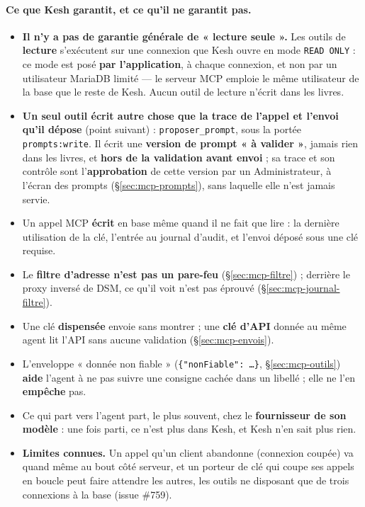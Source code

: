 \documentclass[a4paper,11pt,oneside]{article}
\begin{document}
\paragraph{Ce que Kesh garantit, et ce qu'il ne garantit pas.}
\begin{itemize}
    \item \textbf{Il n'y a pas de garantie générale de « lecture seule ».} Les outils de \textbf{lecture} s'exécutent sur une connexion que Kesh ouvre en mode \texttt{READ ONLY} : ce mode est posé \textbf{par l'application}, à chaque connexion, et non par un utilisateur MariaDB limité --- le serveur MCP emploie le même utilisateur de la base que le reste de Kesh. Aucun outil de lecture n'écrit dans les livres.
    \item \textbf{Un seul outil écrit autre chose que la trace de l'appel et l'envoi qu'il dépose} (point suivant) : \texttt{proposer\_prompt}, sous la portée \texttt{prompts:write}. Il écrit une \textbf{version de prompt « à valider »}, jamais rien dans les livres, et \textbf{hors de la validation avant envoi} ; sa trace et son contrôle sont l'\textbf{approbation} de cette version par un Administrateur, à l'écran des prompts (\S\ref{sec:mcp-prompts}), sans laquelle elle n'est jamais servie.
    \item Un appel MCP \textbf{écrit} en base même quand il ne fait que lire : la dernière utilisation de la clé, l'entrée au journal d'audit, et l'envoi déposé sous une clé requise.
    \item Le \textbf{filtre d'adresse n'est pas un pare-feu} (\S\ref{sec:mcp-filtre}) ; derrière le proxy inversé de DSM, ce qu'il voit n'est pas éprouvé (\S\ref{sec:mcp-journal-filtre}).
    \item Une clé \textbf{dispensée} envoie sans montrer ; une \textbf{clé d'API} donnée au même agent lit l'API sans aucune validation (\S\ref{sec:mcp-envois}).
    \item L'enveloppe « donnée non fiable » (\texttt{\{"nonFiable": …\}}, \S\ref{sec:mcp-outils}) \textbf{aide} l'agent à ne pas suivre une consigne cachée dans un libellé ; elle ne l'en \textbf{empêche} pas.
    \item Ce qui part vers l'agent part, le plus souvent, chez le \textbf{fournisseur de son modèle} : une fois parti, ce n'est plus dans Kesh, et Kesh n'en sait plus rien.
    \item \textbf{Limites connues.} Un appel qu'un client abandonne (connexion coupée) va quand même au bout côté serveur, et un porteur de clé qui coupe ses appels en boucle peut faire attendre les autres, les outils ne disposant que de trois connexions à la base (issue \#759).
\end{itemize}
\end{document}
